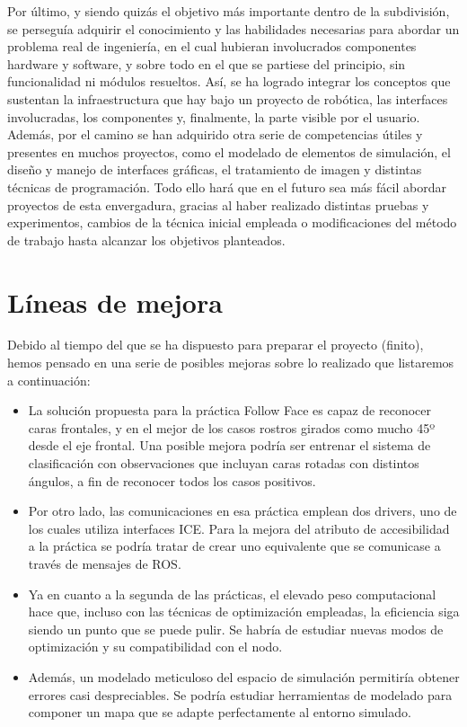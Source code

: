 Por último, y siendo quizás el objetivo más importante dentro de la subdivisión, se perseguía adquirir el conocimiento y las habilidades necesarias para abordar un problema real de ingeniería, en el cual hubieran involucrados componentes hardware y software, y sobre todo en el que se partiese del principio, sin funcionalidad ni módulos resueltos. Así, se ha logrado integrar los conceptos que sustentan la infraestructura que hay bajo un proyecto de robótica, las interfaces involucradas, los componentes y, finalmente, la parte visible por el usuario. Además, por el camino se han adquirido otra serie de competencias útiles y presentes en muchos proyectos, como el modelado de elementos de simulación, el diseño y manejo de interfaces gráficas, el tratamiento de imagen y distintas técnicas de programación. Todo ello hará que en el futuro sea más fácil abordar proyectos de esta envergadura, gracias al haber realizado distintas pruebas y experimentos, cambios de la técnica inicial empleada o modificaciones del método de trabajo hasta alcanzar los objetivos planteados.

\section{Líneas de mejora}
Debido al tiempo del que se ha dispuesto para preparar el proyecto (finito), hemos pensado en una serie de posibles mejoras sobre lo realizado que listaremos a continuación:

\begin{itemize}
	\item La solución propuesta para la práctica Follow Face es capaz de reconocer caras frontales, y en el mejor de los casos rostros girados como mucho 45º desde el eje frontal. Una posible mejora podría ser entrenar el sistema de clasificación con observaciones que incluyan caras rotadas con distintos ángulos, a fin de reconocer todos los casos positivos.
	\item Por otro lado, las comunicaciones en esa práctica emplean dos drivers, uno de los cuales utiliza interfaces ICE. Para la mejora del atributo de accesibilidad a la práctica se podría tratar de crear uno equivalente que se comunicase a través de mensajes de ROS.
	\item Ya en cuanto a la segunda de las prácticas, el elevado peso computacional hace que, incluso con las técnicas de optimización empleadas, la eficiencia siga siendo un punto que se puede pulir. Se habría de estudiar nuevas modos de optimización y su compatibilidad con el nodo.
	\item Además, un modelado meticuloso del espacio de simulación permitiría obtener errores casi despreciables. Se podría estudiar herramientas de modelado para componer un mapa que se adapte perfectamente al entorno simulado.
\end{itemize}

